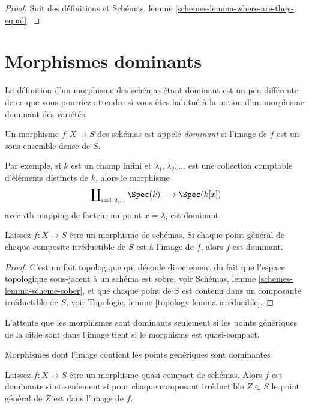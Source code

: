 \begin{proof}
Suit des définitions et Schémas, lemme \ref{schemes-lemma-where-are-they-equal}.
\end{proof}




\section{Morphismes dominants}
\label{section-dominant}

\noindent
La définition d'un morphisme des schémas étant dominant est un peu différente de ce que vous pourriez attendre si vous êtes habitué à la notion d'un morphisme dominant des variétés.

\begin{definition}

\label{definition-dominant}
Un morphisme $f : X \to S$ des schémas est appelé {\it dominant} si l'image de $f$ est un sous-ensemble dense de $S$.
\end{definition}

\noindent
Par exemple, si $k$ est un champ infini et $\lambda_1, \lambda_2, \ldots$ est une collection comptable d'éléments distincts de $k$, alors le morphisme $$
\coprod\nolimits_{i = 1, 2, \ldots } \Spec(k)
\longrightarrow
\Spec(k[x])
$$ avec $i$th mapping de facteur au point $x = \lambda_i$ est dominant.

\begin{lemma}

\label{lemma-generic-points-in-image-dominant}
Laissez $f : X \to S$ être un morphisme de schémas. Si chaque point général de chaque composite irréductible de $S$ est à l'image de $f$, alors $f$ est dominant.
\end{lemma}

\begin{proof}
C'est un fait topologique qui découle directement du fait que l'espace topologique sous-jacent à un schéma est sobre, voir Schémas, lemme \ref{schemes-lemma-scheme-sober}, et que chaque point de $S$ est contenu dans un composante irréductible de $S$, voir Topologie, lemme \ref{topology-lemma-irreducible}.
\end{proof}

\noindent
L'attente que les morphismes sont dominants seulement si les points génériques de la cible sont dans l'image tient si le morphisme est quasi-compact.

\begin{lemma}

\label{lemma-quasi-compact-dominant}

\begin{slogan}
Morphismes dont l'image contient les points génériques sont dominantes
\end{slogan}
Laissez $f : X \to S$ être un morphisme quasi-compact de schémas. Alors $f$ est dominante si et seulement si pour chaque composant irréductible $Z \subset S$ le point général de $Z$ est dans l'image de $f$.
\end{lemma}

